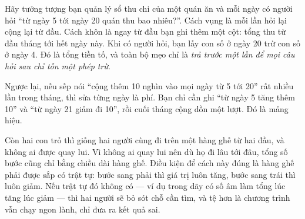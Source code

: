 \documentclass[../../algorithm.tex]{subfiles}
\begin{document}
\begin{dongian}
Hãy tưởng tượng bạn quản lý sổ thu chi của một quán ăn và mỗi ngày có người hỏi ``từ ngày 5 tới ngày 20 quán thu bao nhiêu?''. Cách vụng là mỗi lần hỏi lại cộng lại từ đầu. Cách khôn là ngay từ đầu bạn ghi thêm một cột: tổng thu từ đầu tháng tới hết ngày này. Khi có người hỏi, bạn lấy con số ở ngày 20 trừ con số ở ngày 4. Đó là tổng tiền tố, và toàn bộ mẹo chỉ là \emph{trả trước một lần để mọi câu hỏi sau chỉ tốn một phép trừ}.

Ngược lại, nếu sếp nói ``cộng thêm 10 nghìn vào mọi ngày từ 5 tới 20'' rất nhiều lần trong tháng, thì sửa từng ngày là phí. Bạn chỉ cần ghi ``từ ngày 5 tăng thêm 10'' và ``từ ngày 21 giảm đi 10'', rồi cuối tháng cộng dồn một lượt. Đó là mảng hiệu.

Còn hai con trỏ thì giống hai người cùng đi trên một hàng ghế từ hai đầu, và không ai được quay lui. Vì không ai quay lui nên dù họ đi lâu tới đâu, tổng số bước cũng chỉ bằng chiều dài hàng ghế. Điều kiện để cách này đúng là hàng ghế phải được sắp có trật tự: bước sang phải thì giá trị luôn tăng, bước sang trái thì luôn giảm. Nếu trật tự đó không có --- ví dụ trong dãy có số âm làm tổng lúc tăng lúc giảm --- thì hai người sẽ bỏ sót chỗ cần tìm, và tệ hơn là chương trình vẫn chạy ngon lành, chỉ đưa ra kết quả sai.
\end{dongian}
\end{document}
